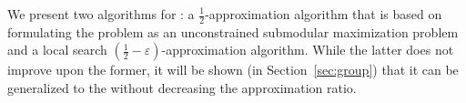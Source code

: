 We present two algorithms for \carpool: a $\frac{1}{2}$-approximation
algorithm that is based on formulating the problem as an unconstrained
submodular maximization problem and a local search $(\frac{1}{2}
- \varepsilon)$-approximation algorithm.  While the latter does not
improve upon the former, it will be shown (in Section~\ref{sec:group})
that it can be generalized to the \gcp without decreasing the
approximation ratio.
 
